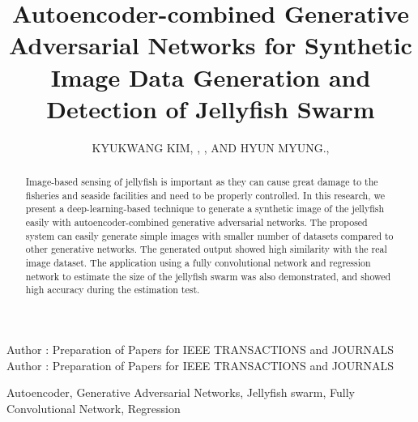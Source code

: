 \documentclass{ieeeaccess}
\begin{document}

\title{Autoencoder-combined Generative Adversarial Networks for Synthetic Image Data Generation and Detection of Jellyfish Swarm}
\author{\uppercase{Kyukwang Kim}, ,
\uppercase{, and Hyun Myung}.,
}
\address[1]{Urban Robotics Laboratory, Korea Advanced Institute of Science and Technology, Daejeon 34141, South Korea.}


\markboth
{Author \headeretal: Preparation of Papers for IEEE TRANSACTIONS and JOURNALS}
{Author \headeretal: Preparation of Papers for IEEE TRANSACTIONS and JOURNALS}


\begin{abstract}
Image-based sensing of jellyfish is important as they can cause great damage to the fisheries and seaside facilities and need to be properly controlled. In this research, we present a deep-learning-based technique to generate a synthetic image of the jellyfish easily with autoencoder-combined generative adversarial networks. The proposed system can easily generate simple images with smaller number of datasets compared to other generative networks. The generated output showed high similarity with the real image dataset. The application using a fully convolutional network and regression network to estimate the size of the jellyfish swarm was also demonstrated, and showed high accuracy during the estimation test.
\end{abstract}

\begin{keywords}
Autoencoder, Generative Adversarial Networks, Jellyfish swarm, Fully Convolutional Network, Regression
\end{keywords}
\end{document}
